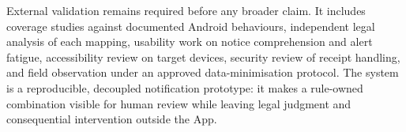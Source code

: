 External validation remains required before any broader claim. It includes coverage studies against documented Android behaviours, independent legal analysis of each mapping, usability work on notice comprehension and alert fatigue, accessibility review on target devices, security review of receipt handling, and field observation under an approved data-minimisation protocol. The system is a reproducible, decoupled notification prototype: it makes a rule-owned combination visible for human review while leaving legal judgment and consequential intervention outside the App.

